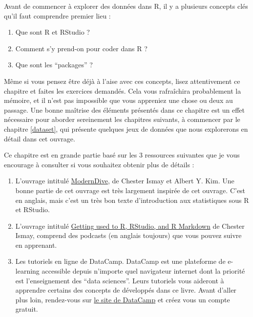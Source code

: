 \documentclass[a4paperpaper,]{article}
\providecommand{\tightlist}{%
  \setlength{\itemsep}{0pt}\setlength{\parskip}{0pt}}
\theoremstyle{definition}
\theoremstyle{definition}
\theoremstyle{definition}
\theoremstyle{remark}
\begin{document}
Avant de commencer à explorer des données dans R, il y a plusieurs
concepts clés qu'il faut comprendre premier lieu :

\begin{enumerate}
\def\labelenumi{\arabic{enumi}.}
\tightlist
\item
  Que sont R et RStudio ?
\item
  Comment s'y prend-on pour coder dans R ?
\item
  Que sont les ``packages'' ?
\end{enumerate}

Même si vous pensez être déjà à l'aise avec ces concepts, lisez
attentivement ce chapitre et faites les exercices demandés. Cela vous
rafraîchira probablement la mémoire, et il n'est pas impossible que vous
appreniez une chose ou deux au passage. Une bonne maîtrise des éléments
présentés dans ce chapitre est un effet nécessaire pour aborder
sereinement les chapitres suivants, à commencer par le chapitre
\ref{dataset}, qui présente quelques jeux de données que nous
explorerons en détail dans cet ouvrage.

Ce chapitre est en grande partie basé sur les 3 ressources suivantes que
je vous encourage à consulter si vous souhaitez obtenir plus de détails
:

\begin{enumerate}
\def\labelenumi{\arabic{enumi}.}
\tightlist
\item
  L'ouvrage intitulé
  \href{https://moderndive.com/index.html}{ModernDive}, de Chester Ismay
  et Albert Y. Kim. Une bonne partie de cet ouvrage est très largement
  inspirée de cet ouvrage. C'est en anglais, mais c'est un très bon
  texte d'introduction aux statistiques sous R et RStudio.
\item
  L'ouvrage intitulé
  \href{https://ismayc.github.io/rbasics-book/}{Getting used to R,
  RStudio, and R Markdown} de Chester Ismay, comprend des podcasts (en
  anglais toujours) que vous pouvez suivre en apprenant.
\item
  Les tutoriels en ligne de DataCamp. DataCamp est une plateforme de
  e-learning accessible depuis n'importe quel navigateur internet dont
  la priorité est l'enseignement des ``data sciences''. Leurs tutoriels
  vous aideront à apprendre certains des concepts de développés dans ce
  livre. Avant d'aller plus loin, rendez-vous sur
  \href{https://www.datacamp.com/}{le site de DataCamp} et créez vous un
  compte gratuit.
\end{enumerate}
\end{document}
